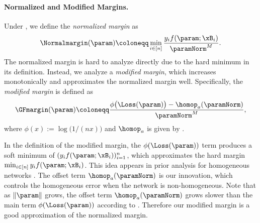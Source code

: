 \paragraph{Normalized and Modified Margins.}
Under , we define the \emph{normalized margin} \citep{lyu2020gradient} as 
\begin{equation}
\label{eq: normalized margin}
    \Normalmargin(\param) \coloneqq  \min_{i \in [n]}\frac{ y_i f(\param;\xB_i)}{\paramNorm^M}.
\end{equation}
The normalized margin is hard to analyze directly due to the hard minimum in its definition. Instead, we analyze a \emph{modified margin}, which increases monotonically and approximates the normalized margin well. Specifically, the \emph{modified margin} is defined as
\begin{equation}
\label{eq: modified margin}
        \GFmargin(\param) \coloneqq \frac{\phi\big(\Loss(\param)\big) - \homop_a(\paramNorm)}{\paramNorm^M},
\end{equation}
where $\phi(x) := \log\big(1/(nx)\big)$ and $\homop_a$ is given by . 

In the definition of the modified margin, the $\phi(\Loss(\param))$ term produces a soft minimum of $(y_i f(\param; \xB_i))_{i=1}^n$, which approximates the hard margin $\min_{i\in [n]} y_i f(\param;\xB_i)$. This idea appears in prior analysis for homogeneous networks \citep{lyu2020gradient,ji2020directional}. 
The offset term $\homop_a(\paramNorm)$ is our innovation, which controls the homogeneous error when the network is non-homogeneous. 
Note that as $\|\param\|$ grows, the offset term $\homop_a(\paramNorm)$ grows slower than the main term $\phi(\Loss(\param))$ according to . Therefore our modified margin is a good approximation of the normalized margin. 

